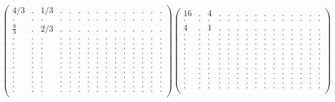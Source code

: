 \documentclass[12pt,a4paper]{amsart}
\begin{document}
\begin{align*}
\left(\begin{array}{rrrrrrrrrrrrrrr}%
4/3&.&1/3&.&.&.&.&.&.&.&.&.&.&.&.\\%
.&.&.&.&.&.&.&.&.&.&.&.&.&.&.\\%
\frac{8}{3}&.&2/3&.&.&.&.&.&.&.&.&.&.&.&.\\%
.&.&.&.&.&.&.&.&.&.&.&.&.&.&.\\%
.&.&.&.&.&.&.&.&.&.&.&.&.&.&.\\%
.&.&.&.&.&.&.&.&.&.&.&.&.&.&.\\%
.&.&.&.&.&.&.&.&.&.&.&.&.&.&.\\%
.&.&.&.&.&.&.&.&.&.&.&.&.&.&.\\%
.&.&.&.&.&.&.&.&.&.&.&.&.&.&.\\%
.&.&.&.&.&.&.&.&.&.&.&.&.&.&.\\%
.&.&.&.&.&.&.&.&.&.&.&.&.&.&.\\%
.&.&.&.&.&.&.&.&.&.&.&.&.&.&.\\%
.&.&.&.&.&.&.&.&.&.&.&.&.&.&.\\%
.&.&.&.&.&.&.&.&.&.&.&.&.&.&.\\%
.&.&.&.&.&.&.&.&.&.&.&.&.&.&.\\%
\end{array}\right)%
\left(\begin{array}{rrrrrrrrrrrrrrr}%
16&.&4&.&.&.&.&.&.&.&.&.&.&.&.\\%
.&.&.&.&.&.&.&.&.&.&.&.&.&.&.\\%
4&.&1&.&.&.&.&.&.&.&.&.&.&.&.\\%
.&.&.&.&.&.&.&.&.&.&.&.&.&.&.\\%
.&.&.&.&.&.&.&.&.&.&.&.&.&.&.\\%
.&.&.&.&.&.&.&.&.&.&.&.&.&.&.\\%
.&.&.&.&.&.&.&.&.&.&.&.&.&.&.\\%
.&.&.&.&.&.&.&.&.&.&.&.&.&.&.\\%
.&.&.&.&.&.&.&.&.&.&.&.&.&.&.\\%
.&.&.&.&.&.&.&.&.&.&.&.&.&.&.\\%
.&.&.&.&.&.&.&.&.&.&.&.&.&.&.\\%
.&.&.&.&.&.&.&.&.&.&.&.&.&.&.\\%
.&.&.&.&.&.&.&.&.&.&.&.&.&.&.\\%
.&.&.&.&.&.&.&.&.&.&.&.&.&.&.\\%
.&.&.&.&.&.&.&.&.&.&.&.&.&.&.\\%
\end{array}\right)%
\end{align*}
\end{document}
